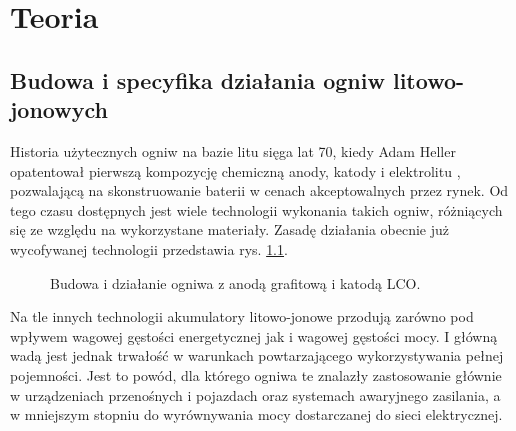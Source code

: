 \documentclass[polish,engineer]{polsl-msth}
\begin{document}
\chapter{Teoria}
\section{Budowa i specyfika działania ogniw litowo-jonowych}
Historia użytecznych ogniw na bazie litu sięga lat 70, kiedy Adam Heller opatentował pierwszą kompozycję chemiczną anody, katody i elektrolitu \cite{heller1975electrochemical}, pozwalającą na skonstruowanie baterii w cenach akceptowalnych przez rynek. Od tego czasu dostępnych jest wiele technologii wykonania takich ogniw, różniących się ze względu na wykorzystane materiały. Zasadę działania obecnie już wycofywanej technologii przedstawia rys. \ref{img:liion_structure}.
\begin{figure}[hbtp]
\centering
     \caption{Budowa i działanie ogniwa z anodą grafitową i katodą LCO. \cite{liionpic_wikimedia}  \label{img:liion_structure}}
\end{figure}
Na tle innych technologii akumulatory litowo-jonowe przodują zarówno pod wpływem wagowej gęstości energetycznej jak i wagowej gęstości mocy. I główną wadą jest jednak trwałość w warunkach powtarzającego wykorzystywania pełnej pojemności. \cite{IBRAHIM20081221} Jest to powód, dla którego ogniwa te znalazły zastosowanie głównie w urządzeniach przenośnych i pojazdach oraz systemach awaryjnego zasilania, a w mniejszym stopniu do wyrównywania mocy dostarczanej do sieci elektrycznej.
\end{document}
